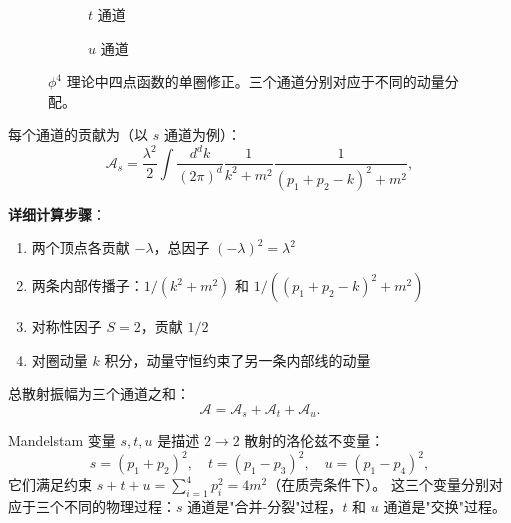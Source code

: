 \begin{example}
\begin{figure}[htbp]
\begin{subfigure}[b]{0.3\textwidth}
\caption{$t$ 通道}
\end{subfigure}
\hfill
\begin{subfigure}[b]{0.3\textwidth}
\centering
{}
\caption{$u$ 通道}
\end{subfigure}
\caption{$\phi^4$ 理论中四点函数的单圈修正。三个通道分别对应于不同的动量分配。}
\label{fig:phi4_4point_loop}
\end{figure}

每个通道的贡献为（以 $s$ 通道为例）：
\begin{equation}
    \mathcal{A}_s = \frac{\lambda^2}{2} \int \frac{d^d k}{(2\pi)^d} \frac{1}{k^2 + m^2} \frac{1}{(p_1 + p_2 - k)^2 + m^2},
\end{equation}

\textbf{详细计算步骤}：
\begin{enumerate}
    \item 两个顶点各贡献 $-\lambda$，总因子 $(-\lambda)^2 = \lambda^2$
    \item 两条内部传播子：$1/(k^2+m^2)$ 和 $1/((p_1+p_2-k)^2+m^2)$
    \item 对称性因子 $S = 2$，贡献 $1/2$
    \item 对圈动量 $k$ 积分，动量守恒约束了另一条内部线的动量
\end{enumerate}

总散射振幅为三个通道之和：
\begin{equation}
    \mathcal{A} = \mathcal{A}_s + \mathcal{A}_t + \mathcal{A}_u.
\end{equation}
\end{example}

\begin{remark}[Mandelstam 变量]
Mandelstam 变量 $s, t, u$ 是描述 $2 \to 2$ 散射的洛伦兹不变量：
\begin{equation}
    s = (p_1+p_2)^2, \quad t = (p_1-p_3)^2, \quad u = (p_1-p_4)^2,
\end{equation}
它们满足约束 $s + t + u = \sum_{i=1}^4 p_i^2 = 4m^2$（在质壳条件下）。
这三个变量分别对应于三个不同的物理过程：$s$ 通道是"合并-分裂"过程，$t$ 和 $u$ 通道是"交换"过程。
\end{remark}

